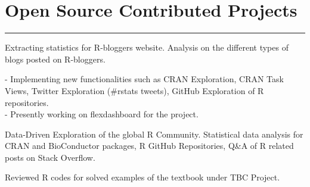 \documentclass[]{meetresume-class}
\begin{document}
\begin{minipage}[t]{0.66\textwidth}
		\section{Open Source Contributed Projects} 
		\noindent\rule{12.5cm}{0.4pt}
		 
		\descript{}
		\noindent
		\hspace{5em}%
		\begin{minipage}{0.85\textwidth\vspace{2pt}}
			Extracting statistics for R-bloggers website. Analysis on the different types of blogs posted on R-bloggers.
		\end{minipage}
		\sectionsep
		
		 
		\descript{}
		\noindent
		\hspace{5em}%
		\begin{minipage}{0.85\textwidth\vspace{2pt}}
			 - Implementing new functionalities such as CRAN Exploration, CRAN Task Views, Twitter Exploration (\#rstats tweets), GitHub Exploration of R repositories.\\
			 - Presently working on flexdashboard for the project.
		\end{minipage}
		\sectionsep
		
		 
		\descript{}
		\noindent
		\hspace{5em}%
		\begin{minipage}{0.85\textwidth\vspace{2pt}}
			Data-Driven Exploration of the global R Community. Statistical data analysis for
			CRAN and BioConductor packages, R GitHub Repositories, Q\&A of R related
			posts on Stack Overflow.
		\end{minipage}
		\sectionsep
		
		 
		\noindent
		\hspace{5em}%
		\begin{minipage}{0.85\textwidth\vspace{2pt}}
			Reviewed R codes for solved examples of the textbook under TBC Project. 
		\end{minipage}
		\sectionsep

\end{minipage}
\end{document}
